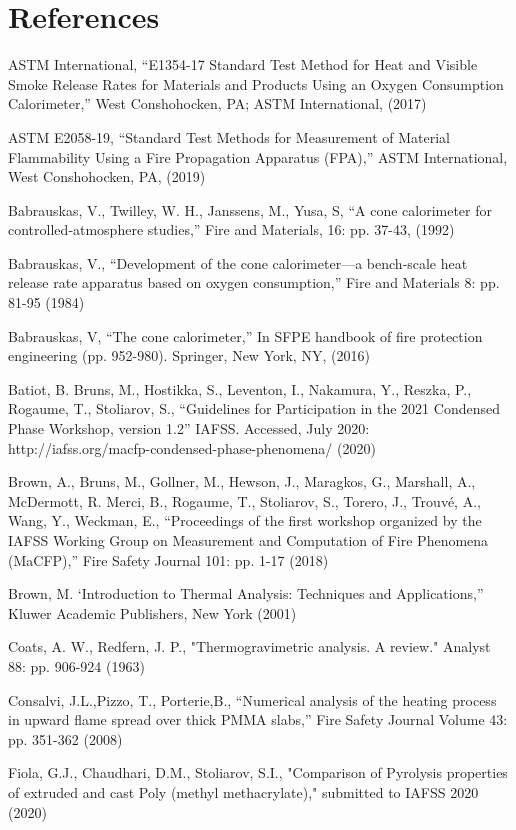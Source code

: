 \documentclass{book}
\begin{document}
\backmatter

\chapter{References}

%

ASTM International, “E1354-17 Standard Test Method for Heat and Visible Smoke Release Rates for Materials and Products Using an Oxygen Consumption Calorimeter,” West Conshohocken, PA; ASTM International, (2017)

ASTM E2058-19, “Standard Test Methods for Measurement of Material Flammability Using a Fire Propagation Apparatus (FPA),” ASTM International, West Conshohocken, PA, (2019)

Babrauskas, V., Twilley, W. H., Janssens, M., Yusa, S, “A cone calorimeter for controlled‐atmosphere studies,” Fire and Materials, 16: pp. 37-43, (1992)

Babrauskas, V., “Development of the cone calorimeter—a bench‐scale heat release rate apparatus based on oxygen consumption,” Fire and Materials 8: pp. 81-95 (1984)

Babrauskas, V, “The cone calorimeter,” In SFPE handbook of fire protection engineering (pp. 952-980). Springer, New York, NY, (2016)

Batiot, B. Bruns, M., Hostikka, S., Leventon, I., Nakamura, Y., Reszka, P., Rogaume, T., Stoliarov, S., “Guidelines for Participation in the 2021 Condensed Phase Workshop, version 1.2” IAFSS. Accessed, July 2020: http://iafss.org/macfp-condensed-phase-phenomena/ (2020)

Brown, A., Bruns, M., Gollner, M., Hewson, J., Maragkos, G., Marshall, A., McDermott, R. Merci, B., Rogaume, T., Stoliarov, S., Torero, J., Trouvé, A., Wang, Y., Weckman, E., “Proceedings of the first workshop organized by the IAFSS Working Group on Measurement and Computation of Fire Phenomena (MaCFP),” Fire Safety Journal 101: pp. 1-17 (2018)

Brown, M.  ‘Introduction to Thermal Analysis: Techniques and Applications,” Kluwer Academic Publishers, New York (2001)

Coats, A. W., Redfern, J. P., "Thermogravimetric analysis. A review." Analyst 88: pp. 906-924 (1963)

Consalvi, J.L.,Pizzo, T., Porterie,B., “Numerical analysis of the heating process in upward flame spread over thick PMMA slabs,” Fire Safety Journal Volume 43: pp. 351-362 (2008)

Fiola, G.J., Chaudhari, D.M., Stoliarov, S.I., "Comparison of Pyrolysis properties of extruded and cast Poly (methyl methacrylate)," submitted to IAFSS 2020 (2020)
\end{document}
